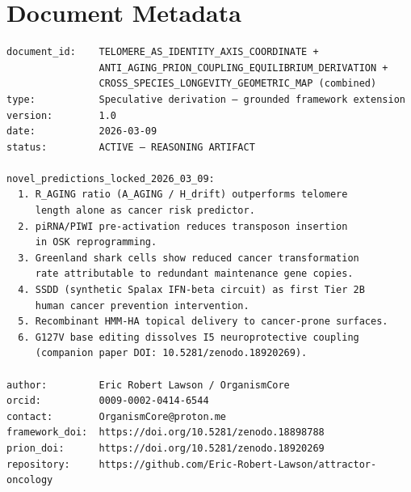 \documentclass[12pt,a4paper]{article}
\begin{document}
\section*{Document Metadata}

\begin{small}
\begin{verbatim}
document_id:    TELOMERE_AS_IDENTITY_AXIS_COORDINATE +
                ANTI_AGING_PRION_COUPLING_EQUILIBRIUM_DERIVATION +
                CROSS_SPECIES_LONGEVITY_GEOMETRIC_MAP (combined)
type:           Speculative derivation — grounded framework extension
version:        1.0
date:           2026-03-09
status:         ACTIVE — REASONING ARTIFACT

novel_predictions_locked_2026_03_09:
  1. R_AGING ratio (A_AGING / H_drift) outperforms telomere
     length alone as cancer risk predictor.
  2. piRNA/PIWI pre-activation reduces transposon insertion
     in OSK reprogramming.
  3. Greenland shark cells show reduced cancer transformation
     rate attributable to redundant maintenance gene copies.
  4. SSDD (synthetic Spalax IFN-beta circuit) as first Tier 2B
     human cancer prevention intervention.
  5. Recombinant HMM-HA topical delivery to cancer-prone surfaces.
  6. G127V base editing dissolves I5 neuroprotective coupling
     (companion paper DOI: 10.5281/zenodo.18920269).

author:         Eric Robert Lawson / OrganismCore
orcid:          0009-0002-0414-6544
contact:        OrganismCore@proton.me
framework_doi:  https://doi.org/10.5281/zenodo.18898788
prion_doi:      https://doi.org/10.5281/zenodo.18920269
repository:     https://github.com/Eric-Robert-Lawson/attractor-oncology
\end{verbatim}
\end{small}
\end{document}
